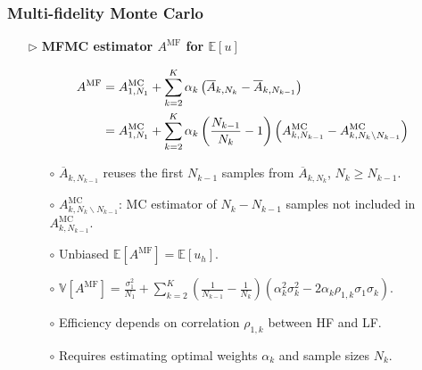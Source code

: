 \documentclass{beamer}
\begin{document}
\begin{frame}[t]
    \frametitle{Multi-fidelity Monte Carlo}
\begin{itemize}[leftmargin=5pt] 
\item[$\triangleright$]\textcolor{myblue3}{\bf MFMC estimator $A^{\text{MF}}$ for $\mathbb{E}[u]$} 

{\footnotesize 
\vspace{-5mm}
\begin{align*}
A^{\text{MF}} &= A^{\text{MC}}_{1,N_1} + \sum_{k=2}^K \alpha_k\left(\overline{A}_{k,N_k} - \overline{A}_{k,N_{k-1}} \right)\\ \vspace{-2mm}
    &= A^{\text{MC}}_{1,N_1} +  \sum_{k=2}^K \alpha_k\left(\frac{N_{k-1}}{N_{k}}-1\right)\left(A_{k,N_{k-1}}^{\text{MC}}- A_{k,N_k\backslash N_{k-1}}^{\text{MC}}\right) 
\end{align*}
\vspace{-3mm}

\begin{itemize}[leftmargin=15pt] 
    \item[$\circ$] $\overline{A}_{k,N_{k-1}}$ reuses the first $N_{k-1}$ samples from $\overline{A}_{k,N_{k}}$, $N_k\ge N_{k-1}$.
    \item[$\circ$] $A^{\text{MC}}_{k,N_k \backslash N_{k-1}}$: MC estimator of $N_k - N_{k-1}$ samples not included in $A^{\text{MC}}_{k,N_{k-1}}$.
    \item[$\circ$] Unbiased $\mathbb{E}[A^{\text{MF}}] = \mathbb{E}[u_h]$.
    \item[$\circ$] $\mathbb{V}[A^{\text{MF}}]= \frac{\sigma_1^2}{N_1} + \sum_{k=2}^K \left(\frac{1}{N_{k-1}} - \frac{1}{N_k}\right)\left(\alpha_k^2\sigma_k^2 - 2\alpha_k\rho_{1,k}\sigma_1\sigma_k\right)$.
    \item[$\circ$] Efficiency depends on correlation $\rho_{1,k}$ between HF and LF.
    \item[$\circ$] Requires estimating optimal weights $\alpha_k$ and sample sizes $N_k$.
\end{itemize}
}

\end{itemize}
\end{frame}
\end{document}
